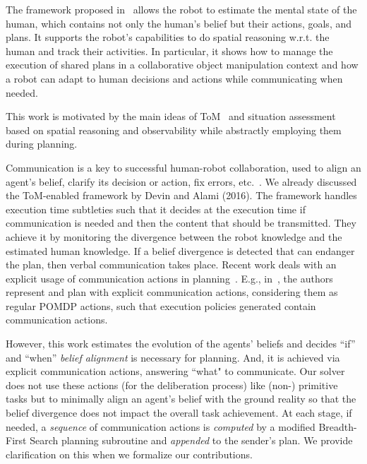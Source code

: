 \documentclass[letterpaper]{article} %
\begin{document}
The framework proposed in~\cite{devin2016implemented} allows the robot to estimate the mental state of the human, which contains not only the human's belief but their actions, goals, and plans. It supports the robot's capabilities to do spatial reasoning w.r.t. the human and track their activities. In particular, it shows how to manage the execution of shared plans in a collaborative object manipulation context and how a robot can adapt to human decisions and actions while communicating when needed.

This work is motivated by the main ideas of ToM~\cite{devin2016implemented} and situation assessment based on spatial reasoning and observability while abstractly employing them during planning. 

Communication is a key to successful human-robot collaboration, used to align an agent's belief, clarify its decision or action, fix errors, etc.~\cite{tellex2014asking,sebastiani2017dealing}. We already discussed the ToM-enabled framework by Devin and Alami (2016). The framework handles execution time subtleties such that it decides at the execution time if communication is needed and then the content that should be transmitted. 
They achieve it by monitoring the divergence between the robot knowledge and the estimated human knowledge. If a belief divergence is detected that can endanger the plan, then verbal communication takes place. 
Recent work deals with an explicit usage of communication actions in planning~\cite{BuisanSA20,nikolaidis2018planning,roncone2017transparent,sanelli2017short,UnhelkarLS20}. 
E.g., in~\cite{roncone2017transparent,UnhelkarLS20}, the authors represent and plan with explicit communication actions, considering them as regular POMDP actions, such that execution policies generated contain communication actions.

However, this work estimates the evolution of the agents' beliefs and decides ``if'' and ``when'' \textit{belief alignment} is necessary for planning. 
And, it is achieved via explicit communication actions, answering ``what" to communicate. 
Our solver does not use these actions (for the deliberation process) like (non-) primitive tasks but to minimally align an agent's belief with the ground reality so that the belief divergence does not impact the overall task achievement. 
At each stage, if needed, a \textit{sequence} of communication actions is \textit{computed} by a modified Breadth-First Search planning subroutine and \textit{appended} to the sender's plan. We provide clarification on this when we formalize our contributions. 
\end{document}
